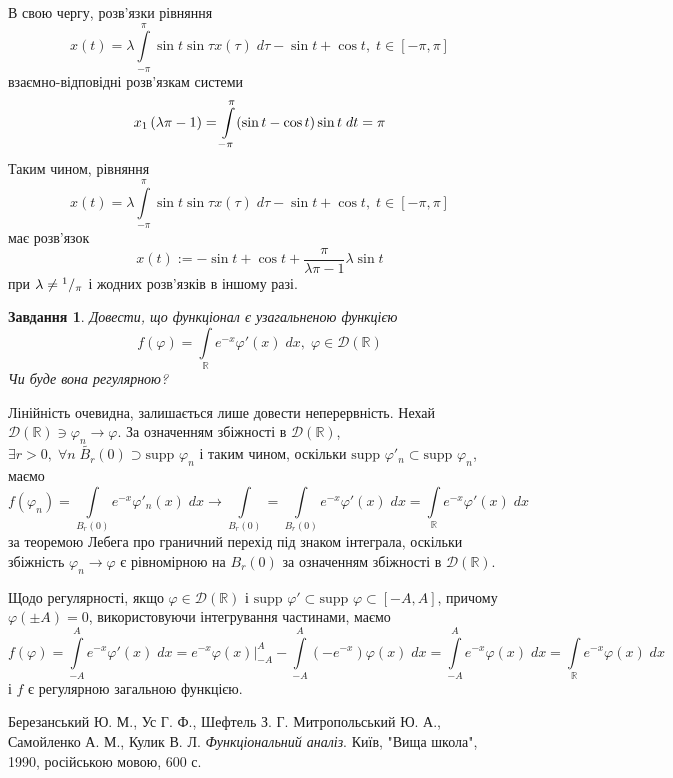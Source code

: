 \documentclass[10pt]{article}
\newtheorem{prob}{Завдання}
\newcommand{\dt}{\;dt}
\newcommand{\dx}{\;dx}
\let\oldint\int
\renewcommand{\int}{\oldint\limits}
\let\phi\varphi
\begin{document}
	В свою чергу, розв’язки рівняння
	\[x(t)=\lambda\int_{-\pi}^{\pi}\sin t\sin\tau x(\tau)\;d\tau-\sin t+\cos t,\;t\in[-\pi,\pi]\]
	взаємно-відповідні розв’язкам системи
	\[x_1\mybra{{\lambda}{\pi}-1}=\int_{-\pi}^\pi(\sin t-\cos t)\sin t\dt=\pi\]
	Таким чином, рівняння
	\[x(t)=\lambda\int_{-\pi}^{\pi}\sin t\sin\tau x(\tau)\;d\tau-\sin t+\cos t,\;t\in[-\pi,\pi]\]
	має розв’язок \[x(t):=-\sin t+\cos t+\frac{\pi}{\lambda\pi-1}\lambda\sin t\]
	при $\lambda\neq{^{1}/_{\pi}}$ і жодних розв’язків в іншому разі.
\begin{prob}
	Довести, що функціонал є узагальненою функцією	\[f(\phi)=\int_{\mathbb{R}}e^{-x}\phi'(x)\dx,\;\phi\in\mathcal{D}(\mathbb{R})\]
	Чи буде вона регулярною?
\end{prob}
\newcommand{\supp}{\mbox{supp }}
Лінійність очевидна, залишається лише довести неперервність. Нехай $\mathcal{D}(\mathbb{R})\ni\phi_n\to\phi$. За означенням
збіжності в $\mathcal{D}(\mathbb{R})$, $\exists r>0,\;
\forall n\;\widetilde{B_r}(0)\supset\supp\phi_n$ і таким чином, оскільки $\supp\phi'_n\subset\supp\phi_n$, маємо
\[f(\phi_n)=\int_{B_r(0)}e^{-x}\phi'_n(x)\dx\to\int_{B_r(0)}=\int_{B_r(0)}e^{-x}\phi'(x)\dx=\int_{\mathbb{R}}e^{-x}\phi'(x)\dx\]
за теоремою Лебега про граничний перехід під знаком інтеграла,
оскільки збіжність $\phi_n\to\phi$ є рівномірною на $B_r(0)$ за означенням збіжності в $\mathcal{D}(\mathbb{R})$.

Щодо регулярності, якщо $\phi\in\mathcal{D}(\mathbb{R})$ і $\supp\phi'\subset\supp\phi\subset[-A,A]$, причому $\phi(\pm A)=0$, використовуючи
інтегрування частинами, маємо
\[f(\phi)=\int_{-A}^Ae^{-x}\phi'(x)\dx=e^{-x}\phi(x)\bigg|_{-A}^A-\int_{-A}^A(-e^{-x})\phi(x)\dx=\int_{-A}^Ae^{-x}\phi(x)\dx=\int_\mathbb{R}
e^{-x}\phi(x)\dx\]
і $f$ є регулярною загальною функцією.
\begin{thebibliography}{9}
Березанський Ю. М., Ус Г. Ф., Шефтель З. Г.
Митропольський Ю. А., Самойленко А. М., Кулик В. Л.
\emph{Функціональний аналіз}.
Київ, "Вища школа"{}, 1990, російською мовою, 600 с.
\end{thebibliography}
\end{document}
